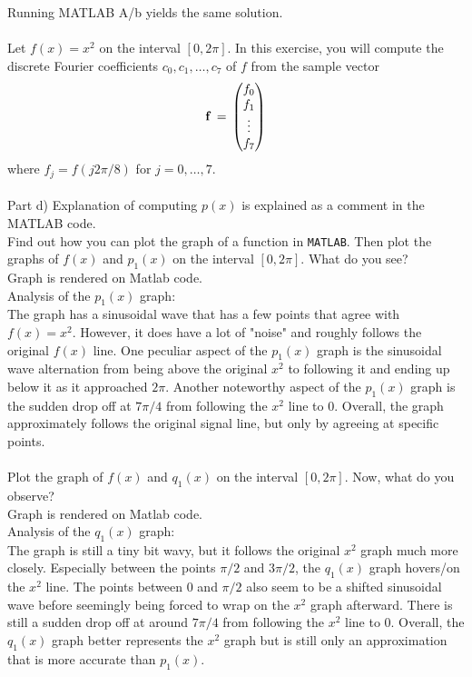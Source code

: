 \documentclass{article}
\begin{document}
Running MATLAB A\slash b yields the same solution.
\\\\

 Let $f(x) = x^2$ on the interval $[0,2\pi]$. In this exercise, you will
compute the discrete Fourier coefficients $c_0, c_1, \ldots, c_7$ of $f$ from the
sample vector
$$ {\bf f} \, = \, \begin{pmatrix} f_0 \\ f_1 \\ \vdots \\ f_7 \end{pmatrix}$$
where $f_j = f(j2\pi/8)$ for $j=0,\ldots, 7$. \\\\

\noindent Part d) Explanation of computing $p(x)$ is explained as a comment in the MATLAB code.\\

 Find out how you can plot the graph of a function in {\tt MATLAB}. Then
plot the graphs of $f(x)$ and $p_1(x)$ on the interval $[0,2\pi]$. What do you see?\\

\noindent Graph is rendered on Matlab code.\\
Analysis of the $p_1(x)$ graph:\\
The graph has a sinusoidal wave that has a few points that agree with $f(x) = x^2$. However, it does have a lot of "noise" and roughly follows the original $f(x)$ line. One peculiar aspect of the $p_1(x)$ graph is the sinusoidal wave alternation from being above the original $x^2$ to following it and ending up below it as it approached $2\pi$. Another noteworthy aspect of the $p_1(x)$ graph is the sudden drop off at $7\pi/4$ from following the $x^2$ line to 0. Overall, the graph approximately follows the original signal line, but only by agreeing at specific points.\\\\

 Plot the graph of $f(x)$ and $q_1(x)$ on the interval $[0,2\pi]$. Now, what
do you observe?\\

\noindent Graph is rendered on Matlab code.\\
Analysis of the $q_1(x)$ graph:\\
The graph is still a tiny bit wavy, but it follows the original $x^2$ graph much more closely. Especially between the points $\pi/2$ and $3\pi/2$, the $q_1(x)$ graph hovers/on the $x^2$ line. The points between 0 and $\pi/2$ also seem to be a shifted sinusoidal wave before seemingly being forced to wrap on the $x^2$ graph afterward. There is still a sudden drop off at around $7\pi/4$ from following the $x^2$ line to 0. Overall, the $q_1(x)$ graph better represents the $x^2$ graph but is still only an approximation that is more accurate than $p_1(x)$.
\end{document}
